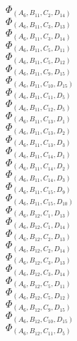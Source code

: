 \documentclass[14pt]{article}
\begin{document}
    $\Phi_{({A}_{6}, {B}_{11}, {C}_{2}, {D}_{14})}$ \\ 
    $\Phi_{({A}_{6}, {B}_{11}, {C}_{3}, {D}_{13})}$ \\ 
    $\Phi_{({A}_{6}, {B}_{11}, {C}_{3}, {D}_{14})}$ \\ 
    $\Phi_{({A}_{6}, {B}_{11}, {C}_{5}, {D}_{11})}$ \\ 
    $\Phi_{({A}_{6}, {B}_{11}, {C}_{5}, {D}_{12})}$ \\ 
    $\Phi_{({A}_{6}, {B}_{11}, {C}_{9}, {D}_{15})}$ \\ 
    $\Phi_{({A}_{6}, {B}_{11}, {C}_{10}, {D}_{15})}$ \\ 
    $\Phi_{({A}_{6}, {B}_{11}, {C}_{11}, {D}_{5})}$ \\ 
    $\Phi_{({A}_{6}, {B}_{11}, {C}_{12}, {D}_{5})}$ \\ 
    $\Phi_{({A}_{6}, {B}_{11}, {C}_{13}, {D}_{1})}$ \\ 
    $\Phi_{({A}_{6}, {B}_{11}, {C}_{13}, {D}_{2})}$ \\ 
    $\Phi_{({A}_{6}, {B}_{11}, {C}_{13}, {D}_{3})}$ \\ 
    $\Phi_{({A}_{6}, {B}_{11}, {C}_{14}, {D}_{1})}$ \\ 
    $\Phi_{({A}_{6}, {B}_{11}, {C}_{14}, {D}_{2})}$ \\ 
    $\Phi_{({A}_{6}, {B}_{11}, {C}_{14}, {D}_{3})}$ \\ 
    $\Phi_{({A}_{6}, {B}_{11}, {C}_{15}, {D}_{9})}$ \\ 
    $\Phi_{({A}_{6}, {B}_{11}, {C}_{15}, {D}_{10})}$ \\ 
    $\Phi_{({A}_{6}, {B}_{12}, {C}_{1}, {D}_{13})}$ \\ 
    $\Phi_{({A}_{6}, {B}_{12}, {C}_{1}, {D}_{14})}$ \\ 
    $\Phi_{({A}_{6}, {B}_{12}, {C}_{2}, {D}_{13})}$ \\ 
    $\Phi_{({A}_{6}, {B}_{12}, {C}_{2}, {D}_{14})}$ \\ 
    $\Phi_{({A}_{6}, {B}_{12}, {C}_{3}, {D}_{13})}$ \\ 
    $\Phi_{({A}_{6}, {B}_{12}, {C}_{3}, {D}_{14})}$ \\ 
    $\Phi_{({A}_{6}, {B}_{12}, {C}_{5}, {D}_{11})}$ \\ 
    $\Phi_{({A}_{6}, {B}_{12}, {C}_{5}, {D}_{12})}$ \\ 
    $\Phi_{({A}_{6}, {B}_{12}, {C}_{9}, {D}_{15})}$ \\ 
    $\Phi_{({A}_{6}, {B}_{12}, {C}_{10}, {D}_{15})}$ \\ 
    $\Phi_{({A}_{6}, {B}_{12}, {C}_{11}, {D}_{5})}$ \\ 
\end{document}
